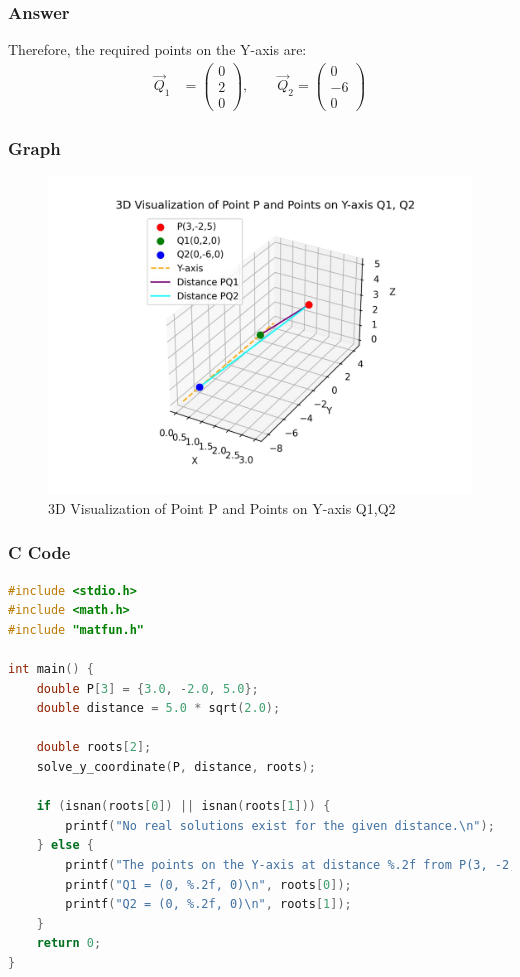\documentclass{beamer}
\theoremstyle{remark}
\numberwithin{equation}{section}
\numberwithin{equation}{section}
\begin{document}
\begin{frame}
\frametitle{Answer}

Therefore, the required points on the Y-axis are:
\begin{align}
\vec{Q}_1 &= \begin{pmatrix} 0 \\ 2 \\ 0 \end{pmatrix}, \qquad
\vec{Q}_2 = \begin{pmatrix} 0 \\ -6 \\ 0 \end{pmatrix}
\end{align}


\end{frame}
\begin{frame}
    \frametitle{Graph}
    \begin{figure}[h!]
        \centering
        \includegraphics[width=0.7\linewidth]{FIG/graph.png}
        \caption{3D Visualization of Point P and Points on Y-axis Q1,Q2}
    \end{figure}
\end{frame}
\begin{frame}[fragile]
\frametitle{C Code }
\begin{lstlisting}[language=C]
#include <stdio.h>
#include <math.h>
#include "matfun.h"

int main() {
    double P[3] = {3.0, -2.0, 5.0};
    double distance = 5.0 * sqrt(2.0);

    double roots[2];
    solve_y_coordinate(P, distance, roots);

    if (isnan(roots[0]) || isnan(roots[1])) {
        printf("No real solutions exist for the given distance.\n");
    } else {
        printf("The points on the Y-axis at distance %.2f from P(3, -2, 5) are:\n", distance);
        printf("Q1 = (0, %.2f, 0)\n", roots[0]);
        printf("Q2 = (0, %.2f, 0)\n", roots[1]);
    }
    return 0;
}

\end{lstlisting}
\end{frame}
\end{document}
